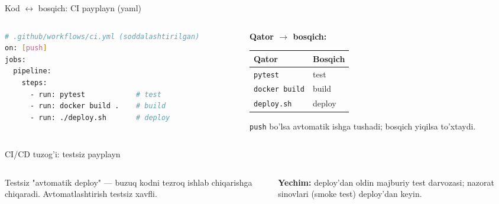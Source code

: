 \documentclass[aspectratio=169,11pt]{beamer}
\begin{document}
\begin{frame}[fragile]{Kod $\leftrightarrow$ bosqich: CI payplayn (yaml)}
  \begin{columns}[T]
    \begin{column}{0.58\textwidth}
\begin{lstlisting}[language=bash]
# .github/workflows/ci.yml (soddalashtirilgan)
on: [push]
jobs:
  pipeline:
    steps:
      - run: pytest            # test
      - run: docker build .    # build
      - run: ./deploy.sh       # deploy
\end{lstlisting}
    \end{column}
    \begin{column}{0.38\textwidth}
      \textbf{Qator $\to$ bosqich:}\\[3pt]
      \footnotesize
      \begin{tabular}{p{1.7cm}p{2.0cm}}
        \toprule
        Qator & Bosqich \\
        \midrule
        \texttt{pytest} & test \\
        \texttt{docker build} & build \\
        \texttt{deploy.sh} & deploy \\
        \bottomrule
      \end{tabular}
      \vspace{4pt}
      \begin{tcolorbox}[okbox,top=2pt,bottom=2pt]
        \footnotesize
        \texttt{push} bo'lsa avtomatik ishga tushadi; bosqich yiqilsa to'xtaydi.
      \end{tcolorbox}
    \end{column}
  \end{columns}
\end{frame}

\begin{frame}{CI/CD tuzog'i: testsiz payplayn}
  \begin{columns}[T]
    \begin{column}{0.52\textwidth}
      \begin{tcolorbox}[warnbox,title={Faqat deploy avtomatik}]
        \small
        Testsiz "avtomatik deploy" --- buzuq kodni tezroq ishlab chiqarishga
        chiqaradi. Avtomatlashtirish testsiz xavfli.
      \end{tcolorbox}
    \end{column}
    \begin{column}{0.44\textwidth}
      \begin{tcolorbox}[okbox,top=2pt,bottom=2pt]
        \footnotesize
        \textbf{Yechim:} deploy'dan oldin majburiy test darvozasi; nazorat
        sinovlari (smoke test) deploy'dan keyin.
      \end{tcolorbox}
    \end{column}
  \end{columns}
\end{frame}
\end{document}
